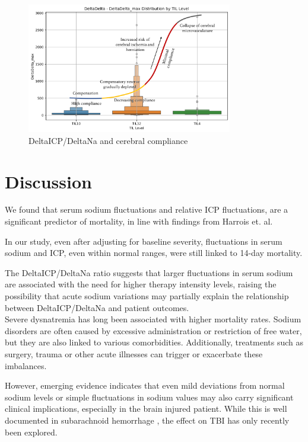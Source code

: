 \begin{figure}[h!]
    \centering
    \includegraphics[width=0.8\textwidth]{pictures/fig13_DDTIL.png}
    \caption{DeltaICP/DeltaNa and cerebral compliance} %
    \label{fig:DDTIL} %
\end{figure}


\section{Discussion}
We found that  serum sodium fluctuations and relative ICP fluctuations, are a significant predictor of mortality, in line with findings from Harrois et. al.\cite{harroisVariabilitySerumSodium2021a}

In our study, even after adjusting for baseline severity, fluctuations in serum sodium and ICP, even within normal ranges, were still linked to 14-day mortality.

The DeltaICP/DeltaNa ratio suggests that larger fluctuations in serum sodium are associated with the need for higher therapy intensity levels, raising the possibility that acute sodium variations may partially explain the relationship between DeltaICP/DeltaNa and patient outcomes.\\

Severe dysnatremia has long been associated with higher mortality rates. Sodium disorders are often caused by excessive administration or restriction of free water, but they are also linked to various comorbidities. Additionally, treatments such as surgery\cite{marshallAssociationSodiumFluctuations2017}\cite{sakrFluctuationsSerumSodium2013}, trauma or other acute illnesses\cite{senSodiumVariabilityAssociated2017a} can trigger or exacerbate these imbalances.

However, emerging evidence\cite{darmonPrognosticConsequencesBorderline2013} indicates that even mild deviations from normal sodium levels or simple fluctuations in sodium values may also carry significant clinical implications, especially in the brain injured patient. While this is well documented in subarachnoid hemorrhage \cite{jinAssociationSerumSodium2022}\cite{labibSodiumItsImpact2024}\cite{balesEffectHyponatremiaSodium2016}\cite{topjianGreaterFluctuationsSerum2014}\cite{eaglesSignificanceFluctuationsSerum2019}\cite{haradaImpactHormonalDynamics2022}, the effect on TBI has only recently been explored\cite{harroisVariabilitySerumSodium2021a}.

